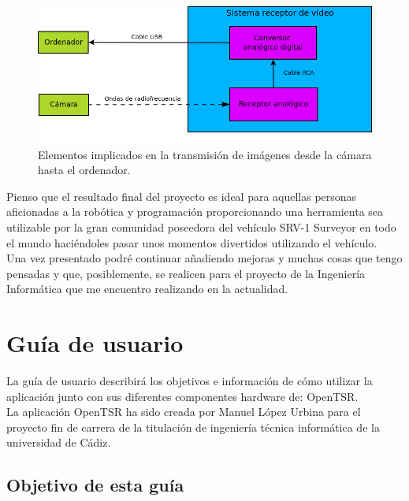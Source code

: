 \documentclass[a4paper,12pt]{article}
\begin{document}
\begin{itemize}
\begin{itemize}
\begin{figure}[H]
  \begin{center}
    \includegraphics[scale=0.45]{imagenes/esquema-sistema-receptor-video.png}
  \end{center}
  \caption{Elementos implicados en la transmisión de imágenes desde la cámara hasta el ordenador.}
  \label{fig:com-camara-pc}
\end{figure}

\end{itemize}

\end{itemize}

Pienso que el resultado final del proyecto es ideal para aquellas personas aficionadas a la robótica y programación proporcionando una herramienta sea utilizable por la gran comunidad poseedora del vehículo SRV-1 Surveyor en todo el mundo haciéndoles pasar unos momentos divertidos utilizando el vehículo.\\

Una vez presentado podré continuar añadiendo mejoras y muchas cosas que tengo pensadas y que, posiblemente, se realicen para el proyecto de la Ingeniería Informática que me encuentro realizando en la actualidad.

\section{Guía de usuario}

La guía de usuario describirá los objetivos e información de cómo utilizar la aplicación junto con sus diferentes componentes hardware de: OpenTSR.\\

La aplicación OpenTSR ha sido creada por Manuel López Urbina para el proyecto fin de carrera de la titulación de ingeniería técnica informática de la universidad de Cádiz.\\

\subsection{Objetivo de esta guía}
\end{document}
